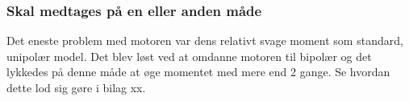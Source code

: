 \subsubsection{Skal medtages på en eller anden måde}

Det eneste problem med motoren var dens relativt svage moment som standard, unipolær model. Det blev løst ved at omdanne motoren til bipolær og det lykkedes på denne måde at øge momentet med mere end 2 gange. Se hvordan dette lod sig gøre i bilag xx.